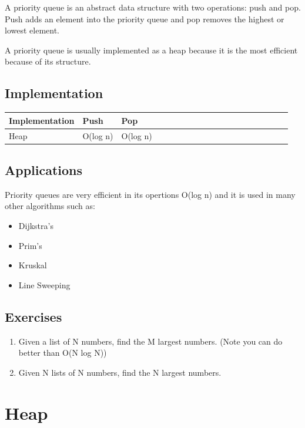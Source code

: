 \documentclass[11pt,oneside]{book}
\begin{document}
A priority queue is an abstract data structure with two operations: push and pop. Push adds an element into the priority queue and pop removes the highest or lowest element.

A priority queue is usually implemented as a heap because it is the most efficient because of its structure.

\subsection{Implementation}

\vspace{10pt} \begin{tabulary}{0.4\linewidth}{|l|l|l|l|l|l|l|l|l|l|l|l|l|l|l|l|l|l|l}\hline


  Implementation &
  Push &
  Pop\\
\hline


  Heap &
  O(log n) &
  O(log n)\\

\hline\end{tabulary}

\subsection{Applications}

Priority queues are very efficient in its opertions O(log n) and it is used in many other algorithms such as:

\begin{itemize}
\item Dijkstra's
\item Prim's
\item Kruskal
\item Line Sweeping
\end{itemize}

\subsection{Exercises}

\begin{enumerate}
\item Given a list of N numbers, find the M largest numbers. (Note you can do better than O(N log N))
\item Given N lists of N numbers, find the N largest numbers.
\end{enumerate}

        \section{ Heap }
        
\end{document}
